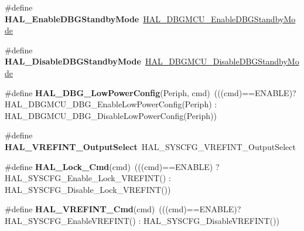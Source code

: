 \begin{DoxyCompactItemize}
\#define {\bfseries H\+A\+L\+\_\+\+Enable\+D\+B\+G\+Standby\+Mode}~\hyperlink{group___h_a_l___exported___functions___group2_ga28a1323b2eeb0a408c1cfdbfa0db5ead}{H\+A\+L\+\_\+\+D\+B\+G\+M\+C\+U\+\_\+\+Enable\+D\+B\+G\+Standby\+Mode}
\item 
\mbox{\label{group___h_a_l___aliased___functions_gac17bfe5c0df5508f778b7f3784b9723a}} 
\#define {\bfseries H\+A\+L\+\_\+\+Disable\+D\+B\+G\+Standby\+Mode}~\hyperlink{group___h_a_l___exported___functions___group2_ga7faa58d8508ea3123b9f247a70379779}{H\+A\+L\+\_\+\+D\+B\+G\+M\+C\+U\+\_\+\+Disable\+D\+B\+G\+Standby\+Mode}
\item 
\mbox{\label{group___h_a_l___aliased___functions_gaeece8fd3268534ce330c635222ce79a3}} 
\#define {\bfseries H\+A\+L\+\_\+\+D\+B\+G\+\_\+\+Low\+Power\+Config}(Periph,  cmd)~(((cmd)==E\+N\+A\+B\+LE)? H\+A\+L\+\_\+\+D\+B\+G\+M\+C\+U\+\_\+\+D\+B\+G\+\_\+\+Enable\+Low\+Power\+Config(Periph) \+: H\+A\+L\+\_\+\+D\+B\+G\+M\+C\+U\+\_\+\+D\+B\+G\+\_\+\+Disable\+Low\+Power\+Config(Periph))
\item 
\mbox{\label{group___h_a_l___aliased___functions_ga2c3d2cdc9071cfc99696e78c29621852}} 
\#define {\bfseries H\+A\+L\+\_\+\+V\+R\+E\+F\+I\+N\+T\+\_\+\+Output\+Select}~H\+A\+L\+\_\+\+S\+Y\+S\+C\+F\+G\+\_\+\+V\+R\+E\+F\+I\+N\+T\+\_\+\+Output\+Select
\item 
\mbox{\label{group___h_a_l___aliased___functions_ga72384357565be710258691efd3b3b72c}} 
\#define {\bfseries H\+A\+L\+\_\+\+Lock\+\_\+\+Cmd}(cmd)~(((cmd)==E\+N\+A\+B\+LE) ? H\+A\+L\+\_\+\+S\+Y\+S\+C\+F\+G\+\_\+\+Enable\+\_\+\+Lock\+\_\+\+V\+R\+E\+F\+I\+NT() \+: H\+A\+L\+\_\+\+S\+Y\+S\+C\+F\+G\+\_\+\+Disable\+\_\+\+Lock\+\_\+\+V\+R\+E\+F\+I\+NT())
\item 
\mbox{\label{group___h_a_l___aliased___functions_ga89195eed3652b3f7ce36e89f3cc8e3a6}} 
\#define {\bfseries H\+A\+L\+\_\+\+V\+R\+E\+F\+I\+N\+T\+\_\+\+Cmd}(cmd)~(((cmd)==E\+N\+A\+B\+LE)? H\+A\+L\+\_\+\+S\+Y\+S\+C\+F\+G\+\_\+\+Enable\+V\+R\+E\+F\+I\+NT() \+: H\+A\+L\+\_\+\+S\+Y\+S\+C\+F\+G\+\_\+\+Disable\+V\+R\+E\+F\+I\+NT())
\item 
\mbox{\label{group___h_a_l___aliased___functions_ga2945c26e7b184a3ee89309906de33cd3}} 

\end{DoxyCompactItemize}
